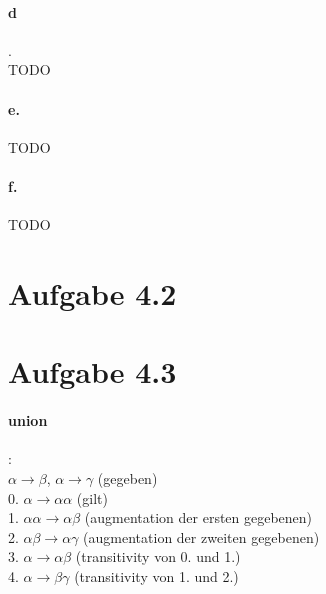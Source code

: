 \documentclass{article}
\begin{document}
		\paragraph*{d}.\\
			TODO
		
		\paragraph*{e.}
			TODO
		
		\paragraph*{f.}
			TODO
	
		\pagebreak
	
	\section*{Aufgabe 4.2}
		
		
		
	\section*{Aufgabe 4.3}
		\paragraph*{union}:\\
			$\alpha \rightarrow \beta$,	$\alpha \rightarrow \gamma$ \hspace*{25mm} (gegeben)\\
			0. $\alpha \rightarrow \alpha \alpha$ \hspace*{31mm} (gilt)\\
			1. $\alpha \alpha \rightarrow \alpha \beta$ \hspace*{29mm} (augmentation der ersten gegebenen)\\
			2. $\alpha \beta \rightarrow \alpha \gamma$ \hspace*{29mm} (augmentation der zweiten gegebenen)\\
			3. $\alpha \rightarrow \alpha \beta$ \hspace*{31mm} (transitivity von 0. und 1.)\\
			4. $\alpha \rightarrow \beta \gamma$ \hspace*{31mm} (transitivity von 1. und 2.)
			
\end{document}
